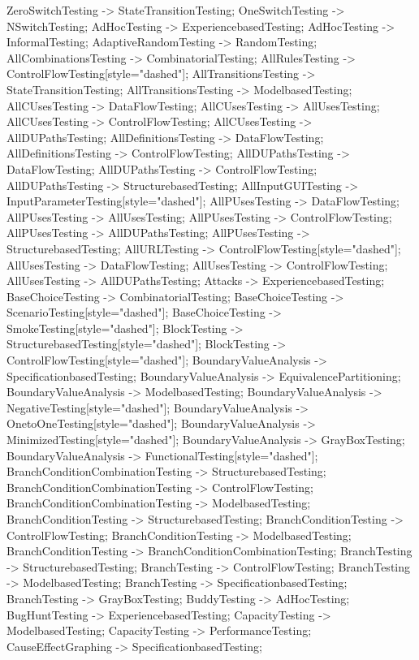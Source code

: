 \documentclass{article}
\begin{document}
{ZeroSwitchTesting -> StateTransitionTesting;
OneSwitchTesting -> NSwitchTesting;
AdHocTesting -> ExperiencebasedTesting;
AdHocTesting -> InformalTesting;
AdaptiveRandomTesting -> RandomTesting;
AllCombinationsTesting -> CombinatorialTesting;
AllRulesTesting -> ControlFlowTesting[style="dashed"];
AllTransitionsTesting -> StateTransitionTesting;
AllTransitionsTesting -> ModelbasedTesting;
AllCUsesTesting -> DataFlowTesting;
AllCUsesTesting -> AllUsesTesting;
AllCUsesTesting -> ControlFlowTesting;
AllCUsesTesting -> AllDUPathsTesting;
AllDefinitionsTesting -> DataFlowTesting;
AllDefinitionsTesting -> ControlFlowTesting;
AllDUPathsTesting -> DataFlowTesting;
AllDUPathsTesting -> ControlFlowTesting;
AllDUPathsTesting -> StructurebasedTesting;
AllInputGUITesting -> InputParameterTesting[style="dashed"];
AllPUsesTesting -> DataFlowTesting;
AllPUsesTesting -> AllUsesTesting;
AllPUsesTesting -> ControlFlowTesting;
AllPUsesTesting -> AllDUPathsTesting;
AllPUsesTesting -> StructurebasedTesting;
AllURLTesting -> ControlFlowTesting[style="dashed"];
AllUsesTesting -> DataFlowTesting;
AllUsesTesting -> ControlFlowTesting;
AllUsesTesting -> AllDUPathsTesting;
Attacks -> ExperiencebasedTesting;
BaseChoiceTesting -> CombinatorialTesting;
BaseChoiceTesting -> ScenarioTesting[style="dashed"];
BaseChoiceTesting -> SmokeTesting[style="dashed"];
BlockTesting -> StructurebasedTesting[style="dashed"];
BlockTesting -> ControlFlowTesting[style="dashed"];
BoundaryValueAnalysis -> SpecificationbasedTesting;
BoundaryValueAnalysis -> EquivalencePartitioning;
BoundaryValueAnalysis -> ModelbasedTesting;
BoundaryValueAnalysis -> NegativeTesting[style="dashed"];
BoundaryValueAnalysis -> OnetoOneTesting[style="dashed"];
BoundaryValueAnalysis -> MinimizedTesting[style="dashed"];
BoundaryValueAnalysis -> GrayBoxTesting;
BoundaryValueAnalysis -> FunctionalTesting[style="dashed"];
BranchConditionCombinationTesting -> StructurebasedTesting;
BranchConditionCombinationTesting -> ControlFlowTesting;
BranchConditionCombinationTesting -> ModelbasedTesting;
BranchConditionTesting -> StructurebasedTesting;
BranchConditionTesting -> ControlFlowTesting;
BranchConditionTesting -> ModelbasedTesting;
BranchConditionTesting -> BranchConditionCombinationTesting;
BranchTesting -> StructurebasedTesting;
BranchTesting -> ControlFlowTesting;
BranchTesting -> ModelbasedTesting;
BranchTesting -> SpecificationbasedTesting;
BranchTesting -> GrayBoxTesting;
BuddyTesting -> AdHocTesting;
BugHuntTesting -> ExperiencebasedTesting;
CapacityTesting -> ModelbasedTesting;
CapacityTesting -> PerformanceTesting;
CauseEffectGraphing -> SpecificationbasedTesting;
}
\end{document}
